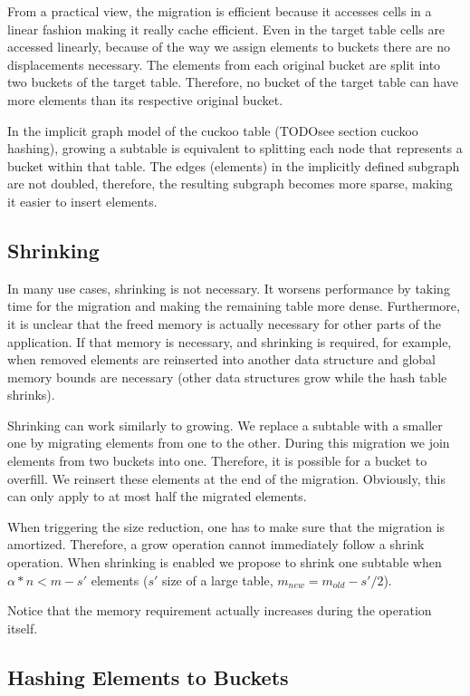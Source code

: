 \documentclass[a4paper,UKenglish]{lipics-v2016}
\begin{document}
From a practical view, the migration is efficient because it accesses
cells in a linear fashion making it really cache efficient.  Even in
the target table cells are accessed linearly, because of the way we
assign elements to buckets there are no displacements necessary.  The
elements from each original bucket are split into two buckets of the
target table.  Therefore, no bucket of the target table can have more
elements than its respective original bucket.

In the implicit graph model of the cuckoo table (TODOsee section
cuckoo hashing), growing a subtable is equivalent to
splitting each node that represents a bucket within that table. The
edges (elements) in the implicitly defined subgraph are not doubled,
therefore, the resulting subgraph becomes more sparse, making it
easier to insert elements.

\subsection{Shrinking}
In many use cases, shrinking is not necessary.  It worsens performance
by taking time for the migration and making the remaining table more
dense.  Furthermore, it is unclear that the freed memory is actually
necessary for other parts of the application.  If that memory is
necessary, and shrinking is required, for example, when removed
elements are reinserted into another data structure and global memory
bounds are necessary (other data structures grow while the hash table
shrinks).

Shrinking can work similarly to growing. We replace a subtable with a
smaller one by migrating elements from one to the other.  During this
migration we join elements from two buckets into one. Therefore, it is
possible for a bucket to overfill.  We reinsert these elements at the
end of the migration.  Obviously, this can only apply to at most half
the migrated elements.

When triggering the size reduction, one has to make sure that the
migration is amortized. Therefore, a grow operation cannot immediately
follow a shrink operation.  When shrinking is enabled we propose to
shrink one subtable when $\alpha*n < m-s'$ elements ($s'$ size of a
large table, $m_{new} = m_{old} -s'/2$).

Notice that the memory requirement actually increases during the
operation itself.
\subsection{Hashing Elements to Buckets}
\end{document}
